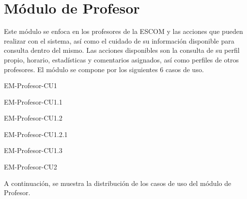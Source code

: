 

\section{Módulo de Profesor}

\noindent
Este módulo se enfoca en los profesores de la ESCOM y las acciones que pueden realizar con el sistema, así
como el cuidado de su información disponible para consulta dentro del mismo. Las acciones disponibles son la
consulta de su perfil propio, horario, estadísticas y comentarios asignados, así como perfiles de otros profesores.
El módulo se compone por los siguientes 6 casos de uso.

\begin{requisitos}{EM-Profesor-CU1}
\end{requisitos}

\begin{requisitos}{EM-Profesor-CU1.1}
\end{requisitos}

\begin{requisitos}{EM-Profesor-CU1.2}
\end{requisitos}

\begin{requisitos}{EM-Profesor-CU1.2.1}
\end{requisitos}

\begin{requisitos}{EM-Profesor-CU1.3}
\end{requisitos}

\begin{requisitos}{EM-Profesor-CU2}
\end{requisitos}

\noindent
A continuación, se muestra la distribución de los casos de uso del módulo de Profesor.

